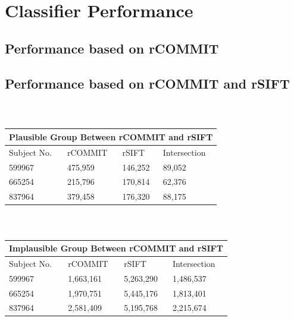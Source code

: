 \section{Classifier Performance}
\subsection{Performance based on rCOMMIT}
\subsection{Performance based on rCOMMIT and rSIFT}




\begin{table}[!ht]
    \centering
    \caption{ }
    ~\\
    \label{table:plaus}
    \begin{tabular}{p{3cm}|p{3cm}|p{3cm}|p{3cm}}
    \toprule
    \multicolumn{4}{c}{\textbf{Plausible Group Between rCOMMIT and rSIFT}} \\
    \toprule
    Subject No. & rCOMMIT & rSIFT & Intersection \\
    \hline
    599967 & 475,959 &146,252 & 89,052 \\
    \hline
    665254 & 215,796 &170,814 & 62,376 \\
    \hline
    837964 & 379,458 &176,320 & 88,175 \\
    \bottomrule
    \end{tabular}
\end{table}


\begin{table}[!ht]
    \centering
    \caption{ }
    ~\\
    \label{table:implaus}
    \begin{tabular}{p{3cm}|p{3cm}|p{3cm}|p{3cm}}
    \toprule
    \multicolumn{4}{c}{\textbf{Implausible Group Between rCOMMIT and rSIFT}} \\
    \toprule
    Subject No. & rCOMMIT & rSIFT & Intersection \\
    \hline
    599967 & 1,663,161 &5,263,290 & 1,486,537 \\
    \hline
    665254 & 1,970,751 &5,445,176 & 1,813,401 \\
    \hline
    837964 & 2,581,409 &5,195,768 & 2,215,674 \\
    \bottomrule
    \end{tabular}
\end{table}



